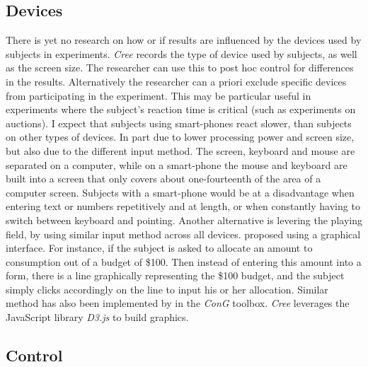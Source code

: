 \documentclass[preprint, 12pt]{elsarticle}
\newcommand{\Cree}{\emph{Cree}\xspace}
\begin{document}
\subsection{Devices}

There is yet no research on how or if results are influenced by the devices used by subjects in experiments. \Cree records the type of device used by subjects, as well as the screen size. The researcher can use this to post hoc control for differences in the results. Alternatively the researcher can a priori exclude specific devices from participating in the experiment. This may be particular useful in experiments where the subject's reaction time is critical (such as experiments on auctions). I expect that subjects using smart-phones react slower, than subjects on other types of devices. In part due to lower processing power and screen size, but also due to the different input method. The screen, keyboard and mouse are separated on a computer, while on a smart-phone the mouse and keyboard are built into a screen that only covers about one-fourteenth of the area of a computer screen. Subjects with a smart-phone would be at a disadvantage when entering text or numbers repetitively and at length, or when constantly having to switch between keyboard and pointing. Another alternative is levering the playing field, by using similar input method across all devices. \cite{Choi_Fisman_Gale_Kariv_2007} proposed using a graphical interface. For instance, if the subject is asked to allocate an amount to consumption out of a budget of \$100. Then instead of entering this amount into a form, there is a line graphically representing the \$100 budget, and the subject simply clicks accordingly on the line to input his or her allocation. Similar method has also been implemented by \cite{Pettit_Friedman_Kephart_Oprea_2014} in the \emph{ConG} toolbox. \Cree leverages the JavaScript library \emph{D3.js} to build graphics.

\subsection{Control}
\end{document}
